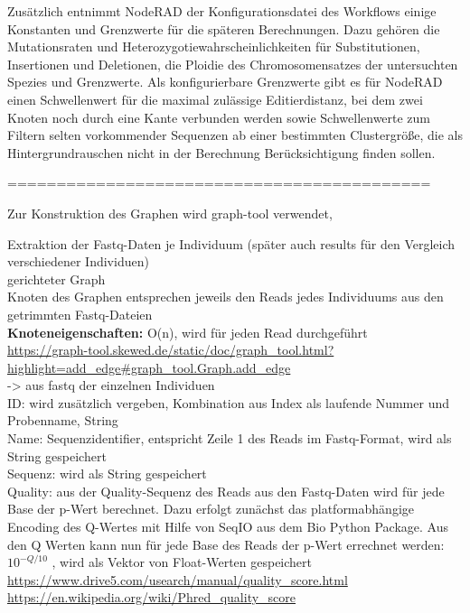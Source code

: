 Zusätzlich entnimmt NodeRAD der Konfigurationsdatei des Workflows einige Konstanten und Grenzwerte für die späteren Berechnungen. Dazu gehören die Mutationsraten und Heterozygotiewahrscheinlichkeiten für Substitutionen, Insertionen und Deletionen, die Ploidie des Chromosomensatzes der untersuchten Spezies und Grenzwerte. Als konfigurierbare Grenzwerte gibt es für NodeRAD einen Schwellenwert für die maximal zulässige Editierdistanz, bei dem zwei Knoten noch durch eine Kante verbunden werden sowie Schwellenwerte zum Filtern selten vorkommender Sequenzen ab einer bestimmten Clustergröße, die als Hintergrundrauschen nicht in der Berechnung Berücksichtigung finden sollen. 


===========================================




Zur Konstruktion des Graphen wird graph-tool verwendet,


Extraktion der Fastq-Daten je Individuum (später auch results für den Vergleich verschiedener Individuen) \\
gerichteter Graph \\
Knoten des Graphen entsprechen jeweils den Reads jedes Individuums aus den getrimmten Fastq-Dateien \\
\textbf{Knoteneigenschaften:} O(n), wird für jeden Read durchgeführt \\
    \url{https://graph-tool.skewed.de/static/doc/graph_tool.html?highlight=add_edge#graph_tool.Graph.add_edge} \\
    -> aus fastq der einzelnen Individuen \\
    ID: wird zusätzlich vergeben, Kombination aus Index als laufende Nummer und Probenname, String \\
    Name: Sequenzidentifier, entspricht Zeile 1 des Reads im Fastq-Format, wird als String gespeichert \\
    Sequenz: wird als String gespeichert \\
    Quality: aus der Quality-Sequenz des Reads aus den Fastq-Daten wird für jede Base der p-Wert berechnet. Dazu erfolgt zunächst das platformabhängige Encoding des Q-Wertes mit Hilfe von SeqIO aus dem Bio Python Package. Aus den Q Werten kann nun für jede Base des Reads der p-Wert errechnet werden: $10^{-Q / 10}$ , wird als Vektor von Float-Werten gespeichert \\
        \url{https://www.drive5.com/usearch/manual/quality_score.html}  \\
        \url{https://en.wikipedia.org/wiki/Phred_quality_score} \\
        
